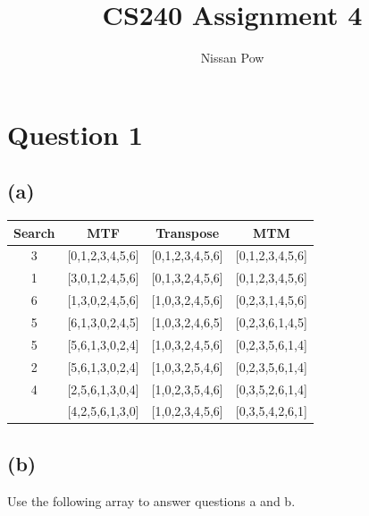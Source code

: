 \documentclass{article}[12pt]
\title{CS240 Assignment 4}
\author{Nissan Pow}
\begin{document}
\maketitle

\section*{Question 1}
\subsection*{(a)}

\begin{tabular}{|c|c|c|c|}
  \hline
  Search & MTF & Transpose & MTM \\
  \hline
  3 & [0,1,2,3,4,5,6] & [0,1,2,3,4,5,6] & [0,1,2,3,4,5,6] \\
  1 & [3,0,1,2,4,5,6] & [0,1,3,2,4,5,6] & [0,1,2,3,4,5,6] \\
  6 & [1,3,0,2,4,5,6] & [1,0,3,2,4,5,6] & [0,2,3,1,4,5,6] \\
  5 & [6,1,3,0,2,4,5] & [1,0,3,2,4,6,5] & [0,2,3,6,1,4,5] \\
  5 & [5,6,1,3,0,2,4] & [1,0,3,2,4,5,6] & [0,2,3,5,6,1,4] \\
  2 & [5,6,1,3,0,2,4] & [1,0,3,2,5,4,6] & [0,2,3,5,6,1,4] \\
  4 & [2,5,6,1,3,0,4] & [1,0,2,3,5,4,6] & [0,3,5,2,6,1,4] \\
  \ & [4,2,5,6,1,3,0] & [1,0,2,3,4,5,6] & [0,3,5,4,2,6,1] \\
  \hline
\end{tabular}

\subsection*{(b)}

Use the following array to answer questions a and b.
\end{document}
